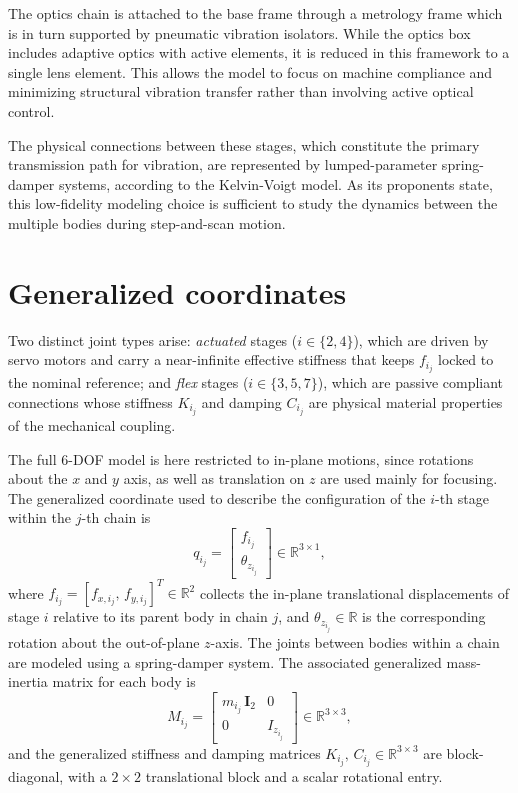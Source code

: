 \documentclass[11pt,letterpaper]{article}
\begin{document}
The optics chain is attached to the base frame through a metrology frame which is in turn supported by pneumatic vibration isolators. While the optics box includes adaptive optics with active elements, it is reduced in this framework to a single lens element. This allows the model to focus on machine compliance and minimizing structural vibration transfer rather than involving active optical control.

The physical connections between these stages, which constitute the primary transmission path for vibration, are represented by lumped-parameter spring-damper systems, according to the Kelvin-Voigt model. As its proponents state, this low-fidelity modeling choice is sufficient to study the dynamics between the multiple bodies during step-and-scan motion.

\section*{Generalized coordinates}

Two distinct joint types arise: \emph{actuated} stages ($i \in \{2,4\}$), which are driven by servo motors and carry a near-infinite effective stiffness that keeps $f_{i_j}$ locked to the nominal reference; and \emph{flex} stages ($i \in \{3,5,7\}$), which are passive compliant connections whose stiffness $K_{i_j}$ and damping $C_{i_j}$ are physical material properties of the mechanical coupling.

The full 6-DOF model is here restricted to in-plane motions, since rotations about the $x$ and $y$ axis, as well as translation on $z$ are used mainly for focusing. The generalized coordinate used to describe the configuration of the $i$-th stage within the $j$-th chain is
\begin{equation}
    q_{i_j} = \begin{bmatrix} f_{i_j} \\ \theta_{z_{i_j}} \end{bmatrix} \in \mathbb{R}^{3\times1},
\end{equation}
where $f_{i_j} = [f_{x,i_j},\, f_{y,i_j}]^T \in \mathbb{R}^{2}$ collects the in-plane translational displacements of stage $i$ relative to its parent body in chain $j$, and $\theta_{z_{i_j}} \in \mathbb{R}$ is the corresponding rotation about the out-of-plane $z$-axis. The joints between bodies within a chain are modeled using a spring-damper system. The associated generalized mass-inertia matrix for each body is
\begin{equation}
    M_{i_j} = \begin{bmatrix} m_{i_j}\,\mathbf{I}_2 & 0 \\ 0 & I_{z_{i_j}} \end{bmatrix} \in \mathbb{R}^{3\times3},
\end{equation}
and the generalized stiffness and damping matrices $K_{i_j},\, C_{i_j} \in \mathbb{R}^{3\times3}$ are block-diagonal, with a $2\times2$ translational block and a scalar rotational entry.
\end{document}
